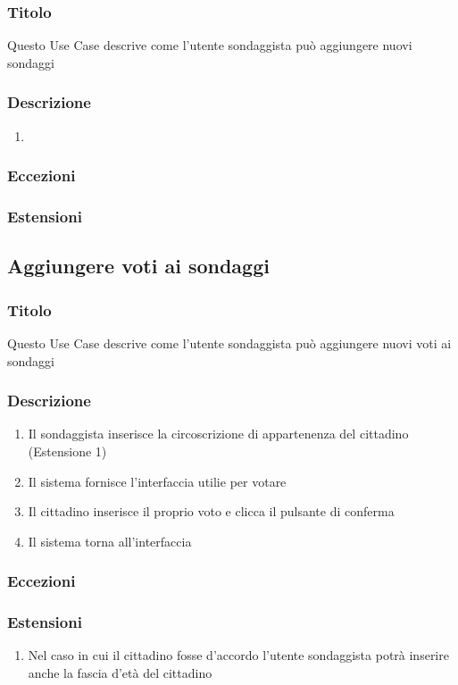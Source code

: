         \subsubsection{Titolo}
            Questo Use Case descrive come l'utente sondaggista può aggiungere nuovi sondaggi
        \subsubsection{Descrizione}
            \begin{enumerate}
                \item 
            \end{enumerate}
        \subsubsection{Eccezioni}
        \subsubsection{Estensioni}
    
    \subsection{Aggiungere voti ai sondaggi}
        \subsubsection{Titolo}
            Questo Use Case descrive come l'utente sondaggista può aggiungere nuovi voti ai sondaggi
        \subsubsection{Descrizione}
            \begin{enumerate}
                \item Il sondaggista inserisce la circoscrizione di appartenenza del cittadino (Estensione 1)
                \item Il sistema fornisce l'interfaccia utilie per votare
                \item Il cittadino inserisce il proprio voto e clicca il pulsante di conferma
                \item Il sistema torna all'interfaccia 
            \end{enumerate}
        \subsubsection{Eccezioni}
        \subsubsection{Estensioni}
            \begin{enumerate}
                \item Nel caso in cui il cittadino fosse d'accordo l'utente sondaggista potrà inserire anche la fascia d'età del cittadino 
            \end{enumerate}